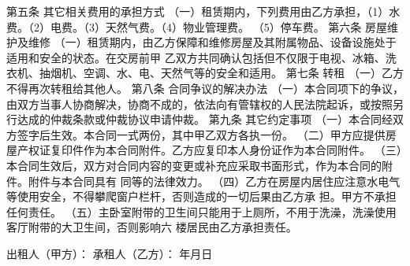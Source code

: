 \documentclass[12pt,a4paper]{article}
\begin{document}
第五条\enspace{} 其它相关费用的承担方式
\newline{}
（一）租赁期内，下列费用由乙方承担，（1）水费。（2）电费。（3）天然气费。（4）物业管理费。
（5）停车费。
\newline{}
\newline{}
第六条\enspace{} 房屋维护及维修
\newline{}
\newline{}
（一）租赁期内，由乙方保障和维修房屋及其附属物品、设备设施处于适用和安全的状态。在交房前甲
乙双方共同确认包括但不仅限于电视、冰箱、洗衣机、抽烟机、空调、水、电、天然气等的安全和适用。
\newline{}
\newline{}
第七条\enspace{} 转租
\newline{}
（一）乙方不得再次转租给其他人。
\newline{}
\newline{}
第八条\enspace{} 合同争议的解决办法
\newline{}
（一）本合同项下的争议，由双方当事人协商解决，协商不成的，依法向有管辖权的人民法院起诉，或按照另
行达成的仲裁条款或仲裁协议申请仲裁。
\newline{}
\newline{}
第九条\enspace{} 其它约定事项
\newline{}
（一）本合同经双方签字后生效。本合同一式两份，其中甲乙双方各执一份。
\newline{}
（二）甲方应提供房屋产权证复印件作为本合同附件。乙方应复印本人身份证作为本合同附件。
\newline{}
（三）本合同生效后，双方对合同内容的变更或补充应采取书面形式，作为本合同的附件。附件与本合同具有
同等的法律效力。
\newline{}
（四）乙方在房屋内居住应注意水电气等使用安全，不得攀爬窗户栏杆，否则造成的一切后果由乙方承
担。甲方不承担任何责任。
\newline{}
（五）主卧室附带的卫生间只能用于上厕所，不用于洗澡，洗澡使用客厅附带的大卫生间，否则影响六
楼居民由乙方承担责任。
\newline{}
\newline{}

\hspace*{9cm}出租人（甲方）：
\newline{}
\newline{}
\hspace*{9.6cm}承租人（乙方）：
\newline{}
\newline{}
\hspace*{8cm}年\hspace*{1cm}月\hspace*{1cm}日






\clearpage
\end{document}

